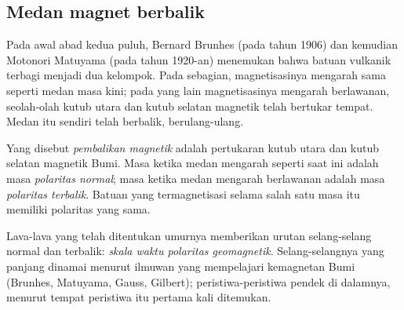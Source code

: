 \subsection{Medan magnet berbalik}

Pada awal abad kedua puluh, Bernard Brunhes (pada tahun 1906) dan kemudian
Motonori Matuyama (pada tahun 1920-an) menemukan bahwa batuan vulkanik terbagi
menjadi dua kelompok. Pada sebagian, magnetisasinya mengarah sama seperti medan
masa kini; pada yang lain magnetisasinya mengarah berlawanan, seolah-olah kutub
utara dan kutub selatan magnetik telah bertukar tempat. Medan itu sendiri
telah berbalik, berulang-ulang.

\begin{definition}\label{def:g11:drift-to-spreading:reversal}
Yang disebut \emph{pembalikan magnetik} adalah
pertukaran kutub utara dan kutub selatan magnetik Bumi. Masa ketika medan
mengarah seperti saat ini adalah masa
\emph{polaritas normal}; masa ketika medan mengarah
berlawanan adalah masa \emph{polaritas terbalik}.
Batuan yang termagnetisasi selama salah
satu masa itu memiliki polaritas yang sama.
\end{definition}

Lava-lava yang telah ditentukan umurnya memberikan urutan selang-selang
normal dan terbalik: \emph{skala waktu polaritas geomagnetik}. Selang-selangnya
yang panjang dinamai menurut ilmuwan yang mempelajari kemagnetan Bumi
(Brunhes, Matuyama, Gauss, Gilbert); peristiwa-peristiwa pendek di dalamnya,
menurut tempat peristiwa itu pertama kali ditemukan.

